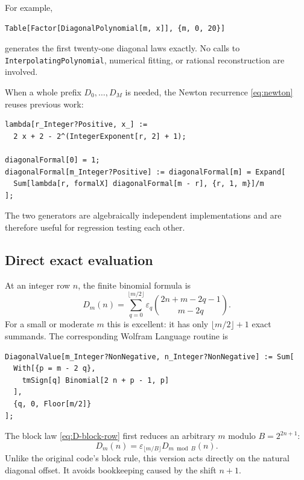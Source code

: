 \documentclass[11pt,oneside]{article}
\theoremstyle{definition}
\theoremstyle{remark}
\newcommand{\eps}{\varepsilon}
\newcommand{\Diag}{D}
\begin{document}
For example,
\begin{lstlisting}[style=code,language=Wolfram]
Table[Factor[DiagonalPolynomial[m, x]], {m, 0, 20}]
\end{lstlisting}
generates the first twenty-one diagonal laws exactly.  No calls to
\texttt{InterpolatingPolynomial}, numerical fitting, or rational
reconstruction are involved.

When a whole prefix $\Diag_0,\ldots,\Diag_M$ is needed, the Newton recurrence
\eqref{eq:newton} reuses previous work:

\begin{lstlisting}[style=code,language=Wolfram]
lambda[r_Integer?Positive, x_] :=
  2 x + 2 - 2^(IntegerExponent[r, 2] + 1);

diagonalFormal[0] = 1;
diagonalFormal[m_Integer?Positive] := diagonalFormal[m] = Expand[
  Sum[lambda[r, formalX] diagonalFormal[m - r], {r, 1, m}]/m
];
\end{lstlisting}

The two generators are algebraically independent implementations and are
therefore useful for regression testing each other.

\subsection{Direct exact evaluation}

At an integer row $n$, the finite binomial formula is
\begin{equation}
 \Diag_m(n)=\sum_{q=0}^{\lfloor m/2\rfloor}
 \eps_q\binom{2n+m-2q-1}{m-2q}.
 \label{eq:direct-integer-value}
\end{equation}
For a small or moderate $m$ this is excellent: it has only
$\lfloor m/2\rfloor+1$ exact summands.  The corresponding Wolfram Language
routine is

\begin{lstlisting}[style=code,language=Wolfram]
DiagonalValue[m_Integer?NonNegative, n_Integer?NonNegative] := Sum[
  With[{p = m - 2 q},
    tmSign[q] Binomial[2 n + p - 1, p]
  ],
  {q, 0, Floor[m/2]}
];
\end{lstlisting}

The block law \eqref{eq:D-block-row} first reduces an arbitrary $m$ modulo
$B=2^{2n+1}$:
\begin{equation}
 \Diag_m(n)=\eps_{\lfloor m/B\rfloor}\Diag_{m\bmod B}(n).
 \label{eq:diagonal-block-reduction}
\end{equation}
Unlike the original code's block rule, this version acts directly on the
natural diagonal offset.  It avoids bookkeeping caused by the shift $n+1$.
\end{document}
